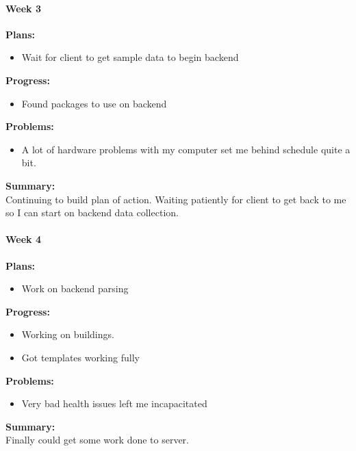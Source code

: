 \paragraph{Week 3}
\begin{adjustwidth}{2.5em}{0pt}
    \vspace{-0.5cm}\textbf{Plans:}
    \vspace{-0.5cm}
    \begin{itemize}
        \item Wait for client to get sample data to begin backend 
    \end{itemize} 
    \vspace{-0.3cm}\textbf{Progress:}
    \vspace{-0.5cm}
    \begin{itemize}
        \item Found packages to use on backend 
	\end{itemize} 
    \vspace{-0.3cm}\textbf{Problems:}
    \vspace{-0.5cm}
    \begin{itemize}
        \item A lot of hardware problems with my computer set me behind schedule quite a bit. 
    \end{itemize}  
    \vspace{-0.3cm}\noindent\textbf{Summary:}\\
    \noindent Continuing to build plan of action. Waiting patiently for client to get back to me so I can start on backend data collection.
\end{adjustwidth} 
\paragraph{Week 4}
\begin{adjustwidth}{2.5em}{0pt}
    \vspace{-0.5cm}\textbf{Plans:}
    \vspace{-0.5cm}
    \begin{itemize}
        \item Work on backend parsing
    \end{itemize} 
    \vspace{-0.3cm}\textbf{Progress:}
    \vspace{-0.5cm}
    \begin{itemize}
        \item Working on buildings. 
		\item Got templates working fully  
    \end{itemize} 
    \vspace{-0.3cm}\textbf{Problems:}
    \vspace{-0.5cm}
    \begin{itemize}
        \item Very bad health issues left me incapacitated 
	\end{itemize}  
    \vspace{-0.3cm}\noindent\textbf{Summary:}\\
    \noindent Finally could get some work done to server.
\end{adjustwidth} 
